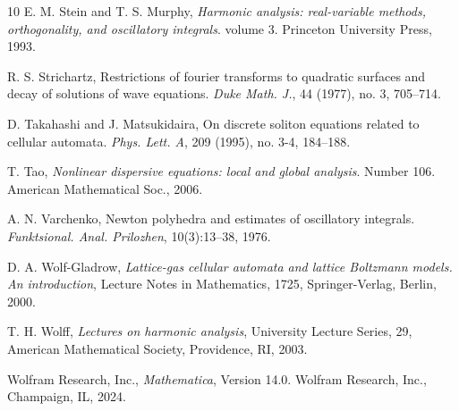 \documentclass[12pt]{amsart}
\begin{document}
\begin{thebibliography}{10}
		E. M. Stein and T. S. Murphy, \emph{Harmonic analysis: real-variable methods, orthogonality, and oscillatory integrals}.
		volume 3. Princeton University Press, 1993.
		
		 R. S. Strichartz, Restrictions of fourier transforms to quadratic surfaces and decay of solutions of wave equations. \emph{Duke Math. J.}, 44 (1977), no. 3, 705–714.
		
		 D. Takahashi and J. Matsukidaira, On discrete soliton equations related to cellular automata. \emph{Phys. Lett. A}, 209 (1995), no. 3-4, 184--188.
		
		 T. Tao, \emph{Nonlinear dispersive equations: local and global analysis}. Number 106. American Mathematical Soc., 2006.
		
		
		
		A. N. Varchenko,
		Newton polyhedra and estimates of oscillatory integrals.
		\emph{Funktsional. Anal. Prilozhen}, 10(3):13--38, 1976.
		
		 D. A. Wolf-Gladrow, \emph{Lattice-gas cellular automata and lattice Boltzmann models. An introduction}, Lecture Notes in Mathematics, 1725, Springer-Verlag, Berlin, 2000.

  T. H. Wolff, \emph{Lectures on harmonic analysis}, University Lecture Series, 29, American Mathematical Society, Providence, RI, 2003.
 
Wolfram Research, Inc.,
\emph{Mathematica}, Version 14.0.
Wolfram Research, Inc., Champaign, IL, 2024.
\end{thebibliography}
	
	
	
\end{document}
